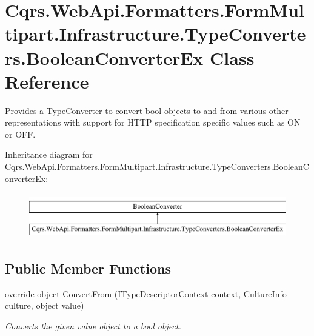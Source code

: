 \hypertarget{classCqrs_1_1WebApi_1_1Formatters_1_1FormMultipart_1_1Infrastructure_1_1TypeConverters_1_1BooleanConverterEx}{}\section{Cqrs.\+Web\+Api.\+Formatters.\+Form\+Multipart.\+Infrastructure.\+Type\+Converters.\+Boolean\+Converter\+Ex Class Reference}
\label{classCqrs_1_1WebApi_1_1Formatters_1_1FormMultipart_1_1Infrastructure_1_1TypeConverters_1_1BooleanConverterEx}


Provides a Type\+Converter to convert bool objects to and from various other representations with support for H\+T\+TP specification specific values such as ON or O\+FF.  


Inheritance diagram for Cqrs.\+Web\+Api.\+Formatters.\+Form\+Multipart.\+Infrastructure.\+Type\+Converters.\+Boolean\+Converter\+Ex\+:\begin{figure}[H]
\begin{center}
\leavevmode
\includegraphics[height=2.000000cm]{classCqrs_1_1WebApi_1_1Formatters_1_1FormMultipart_1_1Infrastructure_1_1TypeConverters_1_1BooleanConverterEx}
\end{center}
\end{figure}
\subsection*{Public Member Functions}
\begin{DoxyCompactItemize}
\item 
override object \hyperlink{classCqrs_1_1WebApi_1_1Formatters_1_1FormMultipart_1_1Infrastructure_1_1TypeConverters_1_1BooleanConverterEx_afac51ee1e191c7b27da72d7cf6f25fa7_afac51ee1e191c7b27da72d7cf6f25fa7}{Convert\+From} (I\+Type\+Descriptor\+Context context, Culture\+Info culture, object value)
\begin{DoxyCompactList}\small\item\em Converts the given {\itshape value}  object to a bool object. \end{DoxyCompactList}\end{DoxyCompactItemize}


